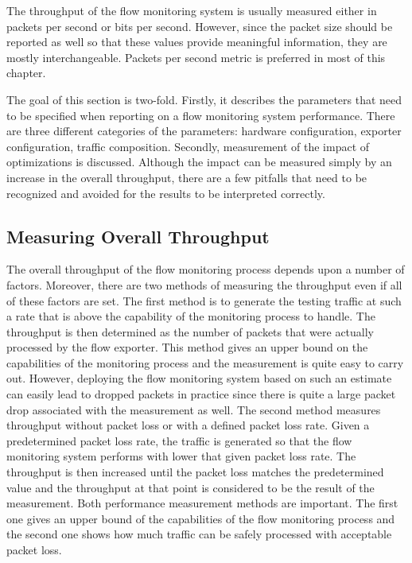 The throughput of the flow monitoring system is usually measured either in packets per second or bits per second. However, since the packet size should be reported as well so that these values provide meaningful information, they are mostly interchangeable. Packets per second metric is preferred in most of this chapter.

The goal of this section is two-fold. Firstly, it describes the parameters that need to be specified when reporting on a flow monitoring system performance. There are three different categories of the parameters: hardware configuration, exporter configuration, traffic composition. Secondly, measurement of the impact of optimizations is discussed. Although the impact can be measured simply by an increase in the overall throughput, there are a few pitfalls that need to be recognized and avoided for the results to be interpreted correctly.


\subsection{Measuring Overall Throughput}

The overall throughput of the flow monitoring process depends upon a number of factors. Moreover, there are two methods of measuring the throughput even if all of these factors are set. The first method is to generate the testing traffic at such a rate that is above the capability of the monitoring process to handle. The throughput is then determined as the number of packets that were actually processed by the flow exporter. This method gives an upper bound on the capabilities of the monitoring process and the measurement is quite easy to carry out. However, deploying the flow monitoring system based on such an estimate can easily lead to dropped packets in practice since there is quite a large packet drop associated with the measurement as well. The second method measures throughput without packet loss or with a defined packet loss rate. Given a predetermined packet loss rate, the traffic is generated so that the flow monitoring system performs with lower that given packet loss rate. The throughput is then increased until the packet loss matches the predetermined value and the throughput at that point is considered to be the result of the measurement. Both performance measurement methods are important. The first one gives an upper bound of the capabilities of the flow monitoring process and the second one shows how much traffic can be safely processed with acceptable packet loss.

